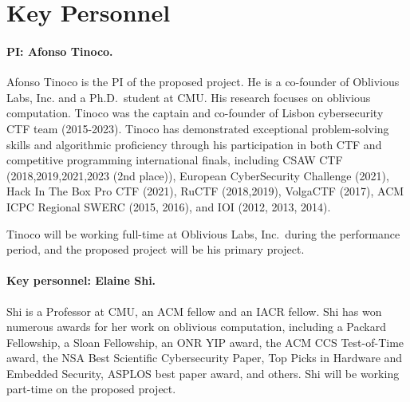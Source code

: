 \section{Key Personnel}
\label{sec:personnel}


\paragraph{PI: Afonso Tinoco.}
Afonso Tinoco
is the PI of the proposed project. He is a co-founder of Oblivious Labs, Inc. and a
Ph.D.\ student at CMU. His research focuses on oblivious computation.
Tinoco was the captain and co-founder of Lisbon cybersecurity CTF team
(2015-2023). Tinoco has demonstrated exceptional problem-solving skills and
algorithmic proficiency through his participation in both CTF and
competitive programming international finals, including CSAW CTF
(2018,2019,2021,2023 (2nd place)), European CyberSecurity Challenge (2021),
Hack In The Box Pro CTF (2021), RuCTF (2018,2019), VolgaCTF (2017), ACM
ICPC Regional SWERC (2015, 2016), and IOI (2012, 2013, 2014).

Tinoco will be working full-time at Oblivious Labs, Inc.\ during the
performance period, and the proposed project will be his primary project.

\paragraph{Key personnel: Elaine Shi.}
Shi is a Professor at CMU, an ACM fellow and an IACR fellow. 
Shi has won numerous awards for her
work on oblivious computation, including a Packard Fellowship, a Sloan
Fellowship, an ONR YIP award, the ACM CCS Test-of-Time award, the NSA Best
Scientific Cybersecurity Paper, Top Picks in Hardware and Embedded
Security, ASPLOS best paper award, and others. Shi will be working
part-time on the proposed project.

